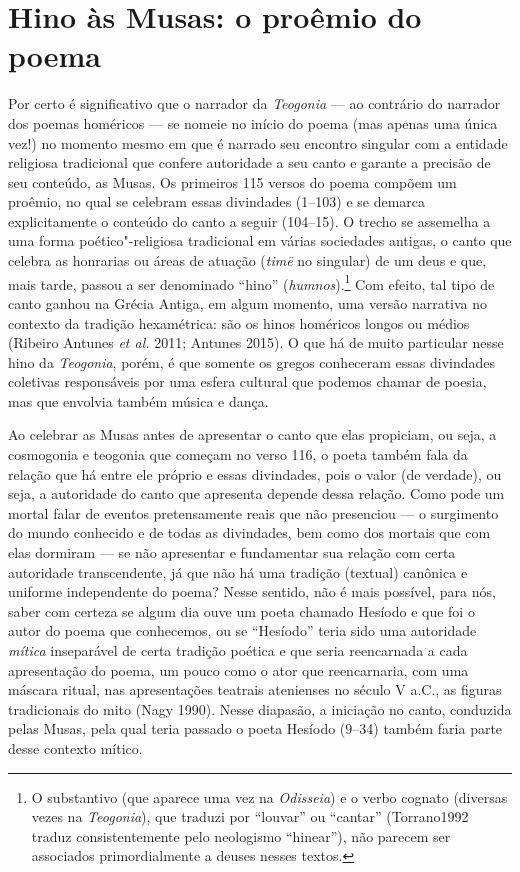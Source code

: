 \section{Hino às Musas: o proêmio do poema}

Por certo é significativo que o narrador da \emph{Teogonia} --- ao
contrário do narrador dos poemas homéricos --- se nomeie no início do
poema (mas apenas uma única vez!) no momento mesmo em que é narrado seu
encontro singular com a entidade religiosa tradicional que confere
autoridade a seu canto e garante a precisão de seu conteúdo, as Musas.
Os primeiros 115 versos do poema compõem um proêmio, no qual se celebram
essas divindades (1--103) e se demarca explicitamente o conteúdo do canto
a seguir (104--15). O trecho se assemelha a uma forma poético"-religiosa
tradicional em várias sociedades antigas, o canto que celebra as
honrarias ou áreas de atuação (\emph{timē} no singular) de um deus e
que, mais tarde, passou a ser denominado ``hino''
(\emph{humnos}).\footnote{O substantivo (que aparece uma vez na
  \emph{Odisseia}) e o verbo cognato (diversas vezes na
  \emph{Teogonia}), que traduzi por ``louvar'' ou ``cantar''
  (Torrano1992 traduz consistentemente pelo neologismo ``hinear''), não
  parecem ser associados primordialmente a deuses nesses textos.} Com
efeito, tal tipo de canto ganhou na Grécia Antiga, em algum momento, uma
versão narrativa no contexto da tradição hexamétrica: são os hinos
homéricos longos ou médios (Ribeiro Antunes \emph{et al.} 2011; Antunes
2015). O que há de muito particular nesse hino da \emph{Teogonia},
porém, é que somente os gregos conheceram essas divindades coletivas
responsáveis por uma esfera cultural que podemos chamar de poesia, mas
que envolvia também música e dança.

Ao celebrar as Musas antes de apresentar o canto que elas propiciam, ou
seja, a cosmogonia e teogonia que começam no verso 116, o poeta também
fala da relação que há entre ele próprio e essas divindades, pois o
valor (de verdade), ou seja, a autoridade do canto que apresenta depende
dessa relação. Como pode um mortal falar de eventos pretensamente reais
que não presenciou --- o surgimento do mundo conhecido e de todas as
divindades, bem como dos mortais que com elas dormiram --- se não
apresentar e fundamentar sua relação com certa autoridade transcendente,
já que não há uma tradição (textual) canônica e uniforme independente do
poema? Nesse sentido, não é mais possível, para nós, saber com certeza
se algum dia ouve um poeta chamado Hesíodo e que foi o autor do poema
que conhecemos, ou se ``Hesíodo'' teria sido uma autoridade
\emph{mítica} inseparável de certa tradição poética e que seria
reencarnada a cada apresentação do poema, um pouco como o ator que
reencarnaria, com uma máscara ritual, nas apresentações teatrais
atenienses no século V a.C., as figuras tradicionais do mito (Nagy
1990). Nesse diapasão, a iniciação no canto, conduzida pelas Musas, pela
qual teria passado o poeta Hesíodo (9--34) também faria parte desse
contexto mítico.

